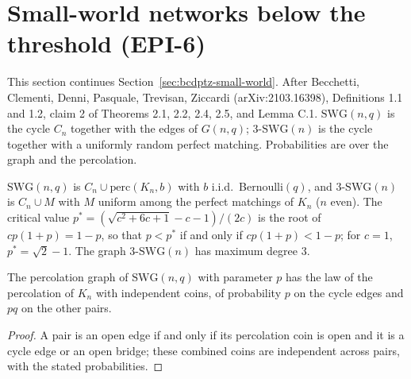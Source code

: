 \section{Small-world networks below the threshold (EPI-6)}
This section continues Section~\ref{sec:bcdptz-small-world}.
After Becchetti, Clementi, Denni, Pasquale, Trevisan, Ziccardi (arXiv:2103.16398), Definitions
1.1 and 1.2, claim 2 of Theorems 2.1, 2.2, 2.4, 2.5, and Lemma C.1. $\mathrm{SWG}(n, q)$ is the
cycle $C_n$ together with the edges of $G(n, q)$; $3\text{-}\mathrm{SWG}(n)$ is the cycle together
with a uniformly random perfect matching. Probabilities are over the graph and the percolation.

\begin{definition}\label{def:swg}
\leanok{}
$\mathrm{SWG}(n, q)$ is $C_n \cup \mathrm{perc}(K_n, b)$ with $b$ i.i.d.\ Bernoulli$(q)$, and
$3\text{-}\mathrm{SWG}(n)$ is $C_n \cup M$ with $M$ uniform among the perfect matchings of $K_n$ ($n$
even). The critical value $p^* = (\sqrt{c^2+6c+1} - c - 1)/(2c)$ is the root of $c p (1 + p) =
1 - p$, so that $p < p^*$ if and only if $c p(1+p) < 1-p$; for $c = 1$, $p^* = \sqrt 2 - 1$. The
graph $3\text{-}\mathrm{SWG}(n)$ has maximum degree $3$.
\end{definition}

\begin{lemma}\label{lem:swg-collapse}
\leanok{}
The percolation graph of $\mathrm{SWG}(n, q)$ with parameter $p$ has the law of the percolation of
$K_n$ with independent coins, of probability $p$ on the cycle edges and $pq$ on the other pairs.
\end{lemma}
\begin{proof}\leanok
A pair is an open edge if and only if its percolation coin is open and it is a cycle edge or an
open bridge; these combined coins are independent across pairs, with the stated probabilities.
\end{proof}

